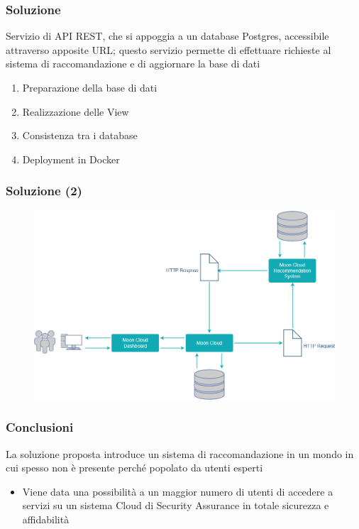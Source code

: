 \begin{frame}
\begin{columns}
\begin{column}{0.5\textwidth}
\begin{figure}
            \end{figure}
        \end{column}
    \end{columns}
\end{frame}

\begin{frame}
    \frametitle{Soluzione}
    Servizio di \alert{API REST}, che si appoggia a un database Postgres, accessibile 
    attraverso apposite URL; questo servizio permette di effettuare richieste al sistema di raccomandazione e di aggiornare la base di dati
    \begin{enumerate}
        \item Preparazione della base di dati
        \item Realizzazione delle View
        \item Consistenza tra i database
        \item Deployment in Docker
    \end{enumerate}
\end{frame}

\begin{frame}
    \frametitle{Soluzione (2)}
    \begin{figure}
        \centering
        \includegraphics[scale=0.42]{images/UML_MoonCloud_HowToDo}
    \end{figure}
\end{frame}

\begin{frame}
    \frametitle{Conclusioni}
    La soluzione proposta introduce un sistema di raccomandazione in un mondo in cui spesso non è presente perché 
    popolato da utenti esperti
    \begin{itemize}
        \item Viene data una possibilità a un \alert{maggior numero di utenti} di accedere a servizi su un sistema Cloud di 
        Security Assurance in totale sicurezza e affidabilità
    \end{itemize}
\end{frame}

